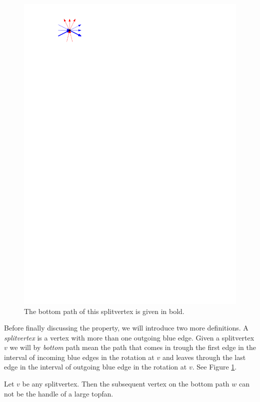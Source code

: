     \begin{figure}
      \centering
      \includegraphics[scale=.9]{unifiedAlgo/img/sweep/bottompath.pdf}
      \caption{The bottom path of this splitvertex is given in bold.}
      \label{fig:sweep:bottomPath}
    \end{figure}

    Before finally discussing the property, we will introduce two more definitions.
    A \emph{splitvertex} is a vertex with more than one outgoing blue edge.
    Given a splitvertex $v$ we will by \emph{bottom} path mean the path that comes in trough the first edge in the interval of incoming blue edges in the rotation at $v$ and leaves through the last edge in the interval of outgoing blue edge in the rotation at $v$.
    See Figure \ref{fig:sweep:bottomPath}.

    \begin{lemma}
      \label{lm:sweep:NoTwoSplitsAboveEachOther}
      Let $v$ be any splitvertex. Then the subsequent vertex on the bottom path $w$ can not be the handle of a large topfan.
    \end{lemma}

